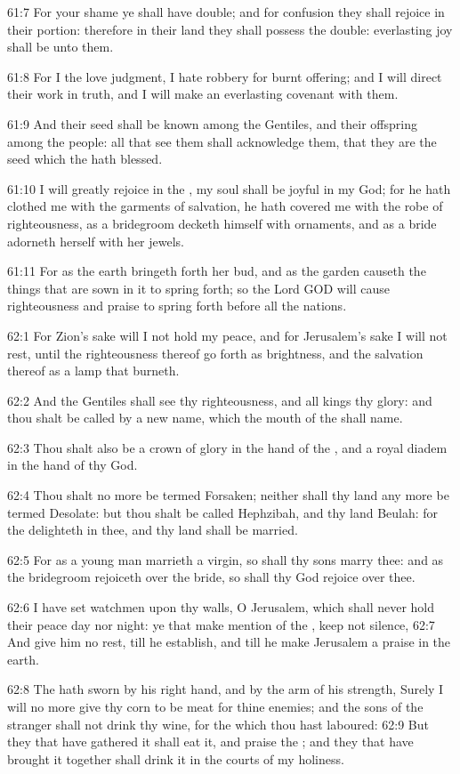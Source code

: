 61:7 For your shame ye shall have double; and for confusion they shall
rejoice in their portion: therefore in their land they shall possess
the double: everlasting joy shall be unto them.

61:8 For I the \LORD love judgment, I hate robbery for burnt offering;
and I will direct their work in truth, and I will make an everlasting
covenant with them.

61:9 And their seed shall be known among the Gentiles, and their
offspring among the people: all that see them shall acknowledge them,
that they are the seed which the \LORD hath blessed.

61:10 I will greatly rejoice in the \LORD, my soul shall be joyful in
my God; for he hath clothed me with the garments of salvation, he hath
covered me with the robe of righteousness, as a bridegroom decketh
himself with ornaments, and as a bride adorneth herself with her
jewels.

61:11 For as the earth bringeth forth her bud, and as the garden
causeth the things that are sown in it to spring forth; so the Lord
GOD will cause righteousness and praise to spring forth before all the
nations.

62:1 For Zion's sake will I not hold my peace, and for Jerusalem's
sake I will not rest, until the righteousness thereof go forth as
brightness, and the salvation thereof as a lamp that burneth.

62:2 And the Gentiles shall see thy righteousness, and all kings thy
glory: and thou shalt be called by a new name, which the mouth of the
\LORD shall name.

62:3 Thou shalt also be a crown of glory in the hand of the \LORD, and
a royal diadem in the hand of thy God.

62:4 Thou shalt no more be termed Forsaken; neither shall thy land any
more be termed Desolate: but thou shalt be called Hephzibah, and thy
land Beulah: for the \LORD delighteth in thee, and thy land shall be
married.

62:5 For as a young man marrieth a virgin, so shall thy sons marry
thee: and as the bridegroom rejoiceth over the bride, so shall thy God
rejoice over thee.

62:6 I have set watchmen upon thy walls, O Jerusalem, which shall
never hold their peace day nor night: ye that make mention of the
\LORD, keep not silence, 62:7 And give him no rest, till he establish,
and till he make Jerusalem a praise in the earth.

62:8 The \LORD hath sworn by his right hand, and by the arm of his
strength, Surely I will no more give thy corn to be meat for thine
enemies; and the sons of the stranger shall not drink thy wine, for
the which thou hast laboured: 62:9 But they that have gathered it
shall eat it, and praise the \LORD; and they that have brought it
together shall drink it in the courts of my holiness.

